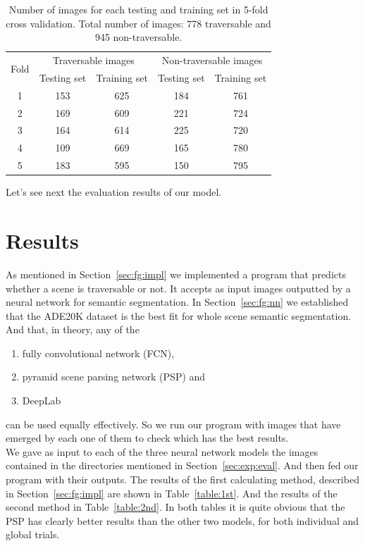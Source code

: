 \documentclass[12pt,a4paper,table,dvipsnames,tikz]{report}
\newcommand{\acronym}{\MakeUppercase}
\newcommand{\bl}[1]{{\hypersetup{linkcolor=blue}#1}}
\begin{document}
	\begin{table}[h!]
		\caption{Number of images for each testing and training set in 5-fold cross validation. 
			Total number of images: 778 traversable and 945 non-traversable.}
		\centering
		\begin{tabular}{|c|c|c|c|c|}
			\hline
			\multirow{2}{*}{Fold} & \multicolumn{2}{c|}{Traversable images} & 
			\multicolumn{2}{c|}{Non-traversable images}\\
			& Testing set & Training set & Testing set & Training set\\
			\hline\hline
			1 & 153 & 625 & 184 & 761\\
			\hline
			2 & 169 & 609 & 221 & 724\\
			\hline
			3 & 164 & 614 & 225 & 720\\
			\hline
			4 & 109 & 669 & 165 & 780\\
			\hline
			5 & 183 & 595 & 150 & 795\\
			\hline
		\end{tabular}
		\label{table:folds_images}
	\end{table}
	
	Let's see next the evaluation results of our model. 
	\\
	
	
	\section{Results}
	\label{sec:exp:res}
	
	As mentioned in Section~\ref{sec:fg:impl} we implemented a program that predicts whether 
	a scene is traversable or not. It accepts as input images outputted by a neural network 
	for semantic segmentation. In Section~\ref{sec:fg:nn} we established that the 
	\acronym{ade20k} dataset is the best fit for whole scene semantic segmentation. And that, 
	in theory, any of the
	\begin{enumerate}
		\item fully convolutional network (\acronym{fcn}), 
		\item pyramid scene parsing network (\acronym{psp}) and 
		\item DeepLab 
	\end{enumerate}
	can be used equally effectively. So we run our program with images that have emerged by 
	each one of them to check which has the best results.
	\\
	
	We gave as input to each of the three neural network models the images contained in the 
	directories mentioned in Section~\ref{sec:exp:eval}. And then fed our program with their 
	outputs. The results of the first calculating method, described in Section~\ref{sec:fg:impl} 
	are shown in Table~\bl{\ref{table:1st}}. And the results of the second method in 
	Table~\bl{\ref{table:2nd}}. In both tables it is quite obvious that the PSP has clearly 
	better results than the other two models, for both individual and global trials.
	\\
	
\end{document}
